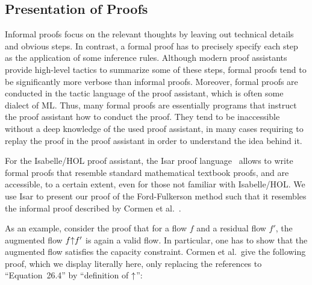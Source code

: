 \documentclass[smallcondensed]{svjour3}     %
\begin{document}
\subsection{Presentation of Proofs}
Informal proofs focus on the relevant thoughts by leaving out technical details and obvious steps. 
In contrast, a formal proof has to precisely specify each step as the application of some inference rules. 
Although modern proof assistants provide high-level tactics to summarize some of these steps, formal proofs tend to be significantly more 
verbose than informal proofs. Moreover, formal proofs are conducted in the tactic language of the proof assistant, which is often some dialect of ML. 
Thus, many formal proofs are essentially programs that instruct the proof assistant how to conduct the proof. They tend to be inaccessible without a deep knowledge of the used proof assistant, in many cases requiring to replay the proof in the proof assistant in order to understand the idea behind it.

For the Isabelle/HOL proof assistant, the Isar proof language~\cite{Wenzel99} allows to write formal proofs that resemble standard mathematical textbook proofs, and are accessible, to a certain extent, even for those not familiar with Isabelle/HOL. 
We use Isar to present our proof of the Ford-Fulkerson method such that it resembles the informal proof described by Cormen et al.~\cite{CLRS09}.

As an example, consider the proof that for a flow $f$ and a residual flow $f'$, the augmented flow $f{\mathbin\uparrow} f'$ is again a valid flow. In particular, one has to show 
that the augmented flow satisfies the capacity constraint. Cormen et al.~give the following proof, which we display literally here, only replacing the references to 
``Equation~26.4'' by ``definition of ${\mathbin\uparrow}$'':
\end{document}
